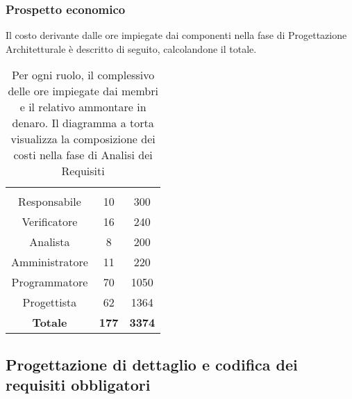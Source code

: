 \subsubsection{Prospetto economico}
Il costo derivante dalle ore impiegate dai componenti nella fase di Progettazione Architetturale è descritto di seguito, calcolandone il totale.

\begin{table}[H]
	{\setlength{\parindent}{0cm}
		\begin{minipage}{.43\textwidth}
			\begin{tabular}{ccc}
				\rowcolorhead
				\headertitle{Ruolo} & \headertitle{Ore} & \headertitle{Costo(€)}\\
				Responsabile & 10 & 300\\
				Verificatore & 16 & 240\\
				Analista & 8 & 200\\
				Amministratore & 11 & 220\\
				Programmatore & 70 & 1050\\
				Progettista & 62 & 1364\\
				\hline
				\textbf{Totale} & \textbf{177} & \textbf{3374}\\
			\end{tabular}
		\end{minipage}%
		\begin{minipage}{.57\textwidth}
	\end{minipage} }
	\caption[Prospetto economico della fase di Analisi dei Requisiti]{Per ogni ruolo, il complessivo delle ore impiegate dai membri e il relativo ammontare in denaro. Il diagramma a torta visualizza la composizione dei costi nella fase di Analisi dei Requisiti}
\end{table}


\subsection{Progettazione di dettaglio e codifica dei requisiti obbligatori}



